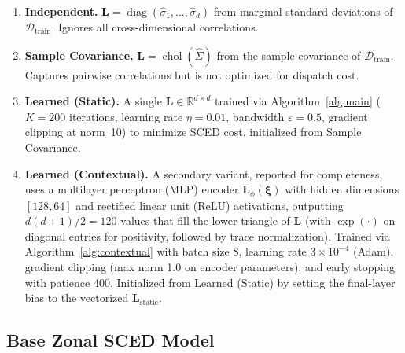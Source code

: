 \documentclass[11pt]{article}
\newcommand{\R}{\mathbb{R}}
\newcommand{\cD}{\mathcal{D}}
\newcommand{\bxi}{\bm{\xi}}
\newcommand{\bL}{\bm{L}}
\DeclareMathOperator{\diag}{diag}
\DeclareMathOperator{\chol}{chol}
\theoremstyle{definition}
\begin{document}
\begin{enumerate}
\item \textbf{Independent.} $\bL = \diag(\hat\sigma_1, \ldots, \hat\sigma_d)$ from marginal standard deviations of $\cD_{\text{train}}$. Ignores all cross-dimensional correlations.

\item \textbf{Sample Covariance.} $\bL = \chol(\hat\Sigma)$ from the sample covariance of $\cD_{\text{train}}$. Captures pairwise correlations but is not optimized for dispatch cost.

\item \textbf{Learned (Static).} A single $\bL \in \R^{d \times d}$ trained via Algorithm~\ref{alg:main} ($K = 200$ iterations, learning rate $\eta = 0.01$, bandwidth $\varepsilon = 0.5$, gradient clipping at norm~10) to minimize SCED cost, initialized from Sample Covariance.

\item \textbf{Learned (Contextual).} A secondary variant, reported for completeness, uses a multilayer perceptron (MLP) encoder $\bL_\phi(\bxi)$ with hidden dimensions $[128, 64]$ and rectified linear unit (ReLU) activations, outputting $d(d+1)/2 = 120$ values that fill the lower triangle of $\bL$ (with $\exp(\cdot)$ on diagonal entries for positivity, followed by trace normalization). Trained via Algorithm~\ref{alg:contextual} with batch size 8, learning rate $3 \times 10^{-4}$ (Adam), gradient clipping (max norm 1.0 on encoder parameters), and early stopping with patience 400. Initialized from Learned (Static) by setting the final-layer bias to the vectorized $\bL_{\mathrm{static}}$.
\end{enumerate}

\subsection{Base Zonal SCED Model}
\end{document}
